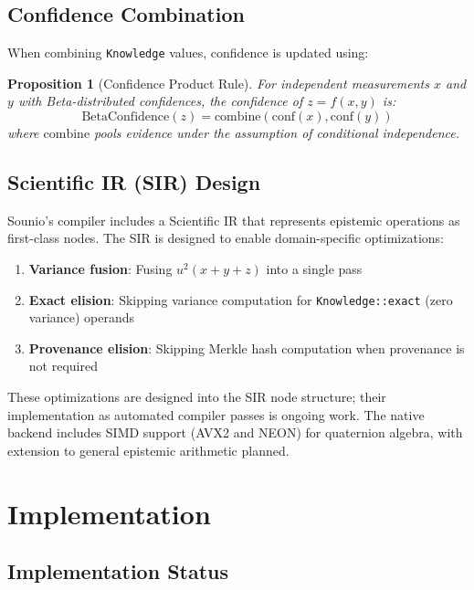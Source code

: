 \documentclass[11pt,a4paper]{article}
\newtheorem{proposition}{Proposition}
\begin{document}
\subsection{Confidence Combination}

When combining \texttt{Knowledge} values, confidence is updated using:

\begin{proposition}[Confidence Product Rule]
For independent measurements $x$ and $y$ with Beta-distributed confidences,
the confidence of $z = f(x, y)$ is:
\[
  \text{BetaConfidence}(z) = \text{combine}(\text{conf}(x), \text{conf}(y))
\]
where $\text{combine}$ pools evidence under the assumption of conditional
independence.
\end{proposition}

\subsection{Scientific IR (SIR) Design}

Sounio's compiler includes a Scientific IR that represents epistemic
operations as first-class nodes. The SIR is designed to enable
domain-specific optimizations:

\begin{enumerate}
  \item \textbf{Variance fusion}: Fusing $u^2(x + y + z)$ into a single pass
  \item \textbf{Exact elision}: Skipping variance computation for
        \texttt{Knowledge::exact} (zero variance) operands
  \item \textbf{Provenance elision}: Skipping Merkle hash computation when
        provenance is not required
\end{enumerate}

These optimizations are designed into the SIR node structure; their
implementation as automated compiler passes is ongoing work. The native
backend includes SIMD support (AVX2 and NEON) for quaternion algebra,
with extension to general epistemic arithmetic planned.

\section{Implementation}
\label{sec:implementation}

\subsection{Implementation Status}
\end{document}
